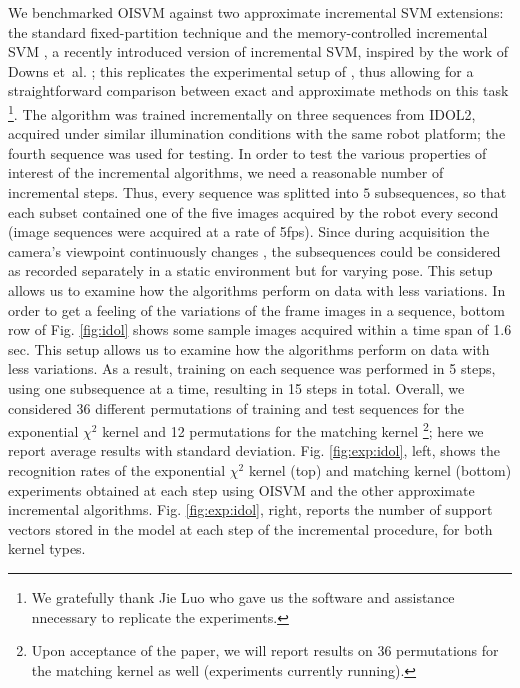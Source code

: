 We benchmarked OISVM against two approximate incremental SVM
extensions: the standard fixed-partition technique
\cite{syed99incremental} and the memory-controlled incremental SVM
\cite{pronobis:icvs06}, a recently introduced version of incremental SVM,
inspired by the work of Downs et~al. \cite{DownsGM01}; this replicates
the experimental setup of \cite{luo:icra07}, thus allowing for a
straightforward comparison between exact and approximate methods on
this task
\footnote{We gratefully thank Jie Luo who gave us the software and assistance 
nnecessary to replicate the experiments.}.  
The algorithm was trained incrementally on three sequences
from IDOL2, acquired under similar illumination conditions with the
same robot platform; the fourth sequence was used for testing. In
order to test the various properties of interest of the incremental
algorithms, we need a reasonable number of incremental steps.  Thus,
every sequence was splitted into $5$ subsequences, so that each subset
contained one of the five images acquired by the robot every second
(image sequences were acquired at a rate of 5fps). Since during
acquisition the camera's viewpoint continuously changes
\cite{luo:icra07}, the subsequences could be considered as recorded
separately in a static environment but for varying pose.  This setup
allows us to examine how the algorithms perform on data with less
variations. In order to get a feeling of the variations of the frame
images in a sequence, bottom row of Fig. \ref{fig:idol} shows some
sample images acquired within a time span of 1.6 sec. This setup
allows us to examine how the algorithms perform on data with less
variations. As a result, training on each sequence was performed in 5
steps, using one subsequence at a time, resulting in 15 steps in
total. Overall, we considered 36 different permutations of training
and test sequences for the exponential $\chi^2$ kernel and 12
permutations for the matching kernel \footnote{Upon acceptance of the
paper, we will report results on 36 permutations for the matching
kernel as well (experiments currently running).}; here we report
average results with standard deviation. Fig. \ref{fig:exp:idol},
left, shows the recognition rates of the exponential $\chi^2$ kernel
(top) and matching kernel (bottom) experiments obtained at each step
using OISVM and the other approximate incremental
algorithms. Fig. \ref{fig:exp:idol}, right, reports the number of
support vectors stored in the model at each step of the incremental
procedure, for both kernel types.

